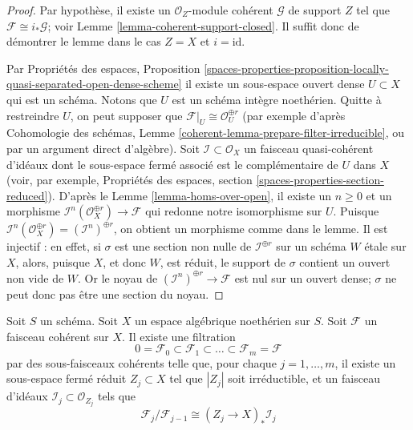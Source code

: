 \begin{proof}
Par hypothèse, il existe un $\mathcal{O}_Z$-module cohérent
$\mathcal{G}$ de support $Z$ tel que $\mathcal{F} \cong i_*\mathcal{G}$; voir
Lemme \ref{lemma-coherent-support-closed}. Il suffit donc de démontrer le
lemme dans le cas $Z = X$ et $i = \text{id}$.

\medskip\noindent
Par Propriétés des espaces, Proposition
\ref{spaces-properties-proposition-locally-quasi-separated-open-dense-scheme}
il existe un sous-espace ouvert dense $U \subset X$ qui est un schéma. Notons que
$U$ est un schéma intègre noethérien. Quitte à restreindre $U$, on peut supposer
que $\mathcal{F}|_U \cong \mathcal{O}_U^{\oplus r}$ (par exemple d'après
Cohomologie des schémas, Lemme \ref{coherent-lemma-prepare-filter-irreducible},
ou par un argument direct d'algèbre). Soit $\mathcal{I} \subset \mathcal{O}_X$
un faisceau quasi-cohérent d'idéaux dont le sous-espace fermé associé
est le complémentaire de $U$ dans $X$ (voir, par exemple,
Propriétés des espaces, section \ref{spaces-properties-section-reduced}). 
D'après le Lemme \ref{lemma-homs-over-open}, il existe un $n \geq 0$ et un
morphisme $\mathcal{I}^n(\mathcal{O}_X^{\oplus r}) \to \mathcal{F}$
qui redonne notre isomorphisme sur $U$. Puisque
$\mathcal{I}^n(\mathcal{O}_X^{\oplus r}) = (\mathcal{I}^n)^{\oplus r}$,
on obtient un morphisme comme dans le lemme. Il est injectif : en effet, si $\sigma$ est
une section non nulle de $\mathcal{I}^{\oplus r}$ sur un schéma $W$ \'etale
sur $X$, alors, puisque $X$, et donc $W$, est réduit, le support de $\sigma$
contient un ouvert non vide de $W$. Or le noyau de
$(\mathcal{I}^n)^{\oplus r} \to \mathcal{F}$ est nul
sur un ouvert dense; $\sigma$ ne peut donc pas être une section du noyau.
\end{proof}

\begin{lemma}
\label{lemma-coherent-filter}
Soit $S$ un schéma. Soit $X$ un espace algébrique noethérien sur $S$.
Soit $\mathcal{F}$ un faisceau cohérent sur $X$. Il existe une filtration
$$
0 = \mathcal{F}_0 \subset \mathcal{F}_1 \subset
\ldots \subset \mathcal{F}_m = \mathcal{F}
$$
par des sous-faisceaux cohérents telle que, pour chaque $j = 1, \ldots, m$,
il existe un sous-espace fermé réduit $Z_j \subset X$ tel que $|Z_j|$
soit irréductible, et un faisceau d'idéaux $\mathcal{I}_j \subset \mathcal{O}_{Z_j}$
tels que
$$
\mathcal{F}_j/\mathcal{F}_{j - 1}
\cong (Z_j \to X)_* \mathcal{I}_j
$$
\end{lemma}

